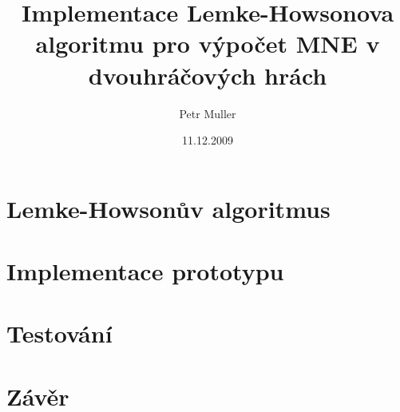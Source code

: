 \documentclass[a4paper, 12pt]{article}
\title{Implementace Lemke-Howsonova algoritmu pro výpočet MNE v dvouhráčových hrách}
\author{Petr Muller}
\date{11.12.2009}
\begin{document}
\maketitle
\section{Lemke-Howsonův algoritmus}
\section{Implementace prototypu}
\section{Testování}
\section{Závěr}
\end{document}
